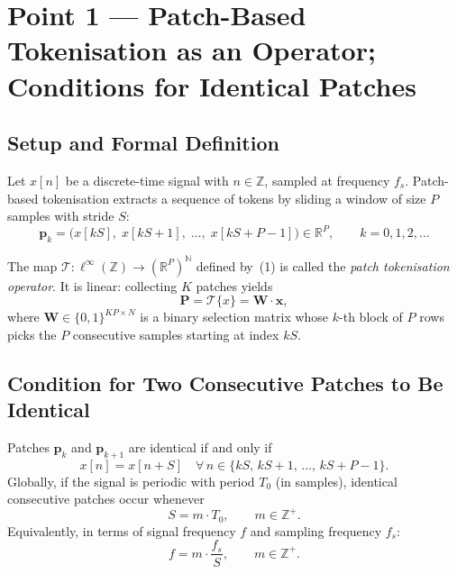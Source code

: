 \section{Point 1 — Patch-Based Tokenisation as an Operator; Conditions for Identical Patches}


\subsection{Setup and Formal Definition}

Let $x[n]$ be a discrete-time signal with $n \in \mathbb{Z}$, sampled at frequency $f_s$.
Patch-based tokenisation extracts a sequence of tokens by sliding a window of size $P$
samples with stride $S$:
\begin{equation}
    \mathbf{p}_k
    = \bigl(x[kS],\; x[kS+1],\; \ldots,\; x[kS+P-1]\bigr)
    \in \mathbb{R}^P,
    \qquad k = 0, 1, 2, \ldots
\end{equation}

\begin{definition}
    The map $\mathcal{T}: \ell^\infty(\mathbb{Z}) \to (\mathbb{R}^P)^{\mathbb{N}}$ defined
    by~(1) is called the \emph{patch tokenisation operator}.  It is linear: collecting $K$
    patches yields
    \begin{equation}
        \mathbf{P} = \mathcal{T}\{x\} = \mathbf{W} \cdot \mathbf{x},
    \end{equation}
    where $\mathbf{W} \in \{0,1\}^{KP \times N}$ is a binary selection matrix whose $k$-th
    block of $P$ rows picks the $P$ consecutive samples starting at index $kS$.
\end{definition}

\subsection{Condition for Two Consecutive Patches to Be Identical}

\begin{proposition}
    Patches $\mathbf{p}_k$ and $\mathbf{p}_{k+1}$ are identical if and only if
    \begin{equation}
        x[n] = x[n + S] \quad \forall\, n \in \{kS,\, kS+1,\, \ldots,\, kS+P-1\}.
    \end{equation}
    Globally, if the signal is periodic with period $T_0$ (in samples), identical
    consecutive patches occur whenever
    \begin{equation}
        \boxed{S = m \cdot T_0, \qquad m \in \mathbb{Z}^+.}
    \end{equation}
    Equivalently, in terms of signal frequency $f$ and sampling frequency $f_s$:
    \begin{equation}
        f = m \cdot \frac{f_s}{S}, \qquad m \in \mathbb{Z}^+.
    \end{equation}
\end{proposition}

